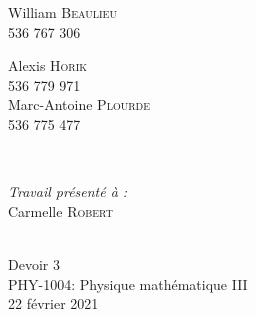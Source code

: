 \documentclass{article}
\begin{document}
\begin{center}
\begin{minipage}{0.4\textwidth}
\begin{flushleft} \large

William \textsc{Beaulieu}\\
536 767 306

Alexis \textsc{Horik}\\
536 779 971\\

Marc-Antoine \textsc{Plourde}\\ 
536 775 477
\end{flushleft}
\end{minipage}
~
\begin{minipage}{0.4\textwidth}
\begin{flushright} \large
\emph{Travail présenté à :} \\
Carmelle \textsc{Robert} \\
\end{flushright}
\end{minipage}\\[0.5cm]
{\Large Devoir 3}\\[0.4cm]
 {\large PHY-1004: Physique mathématique III\\[0.4cm]
 22 février 2021}\\[10pt]
\hrulefill
\end{center}
\end{document}
